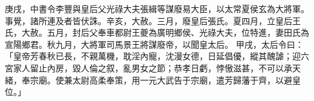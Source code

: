 \begin{pinyinscope}
 
庚戌，中書令李豐與皇后父光祿大夫張緝等謀廢易大臣，以太常夏侯玄為大將軍。事覺，諸所連及者皆伏誅。辛亥，大赦。三月，廢皇后張氏。夏四月，立皇后王氏，大赦。五月，封后父奉車都尉王夔為廣明鄉侯、光祿大夫，位特進，妻田氏為宣陽鄉君。秋九月，大將軍司馬景王將謀廢帝，以聞皇太后。
 甲戌，太后令曰：「皇帝芳春秋已長，不親萬機，耽淫內寵，沈漫女德，日延倡優，縱其醜謔；迎六宮家人留止內房，毀人倫之叙，亂男女之節；恭孝日虧，悖慠滋甚，不可以承天緒，奉宗廟。使兼太尉高柔奉策，用一元大武告于宗廟，遣芳歸藩于齊，以避皇位。」

\end{pinyinscope}
